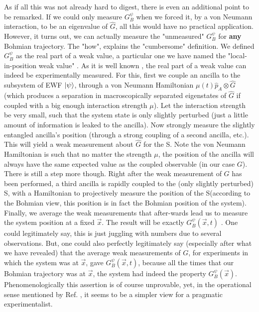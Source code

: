 \documentclass[11pt, a4paper]{article} %
\begin{document}
As if all this was not already hard to digest, there is even an additional point to be remarked. If we could only measure $G_B^\psi$ when we forced it, by a von Neumann interaction, to be an eigenvalue of $\hat{G}$, all this would have no practical application. However, it turns out, we can actually measure the "unmeasured" $G_B^\psi$ for {\bf any} Bohmian trajectory. The "how", explains the "cumbersome" definition. We defined $G^\psi_B$ as the real part of a weak value, a particular one we have named the "local-in-position weak value" \cite{DevInPosition1, DevInPosition2}. As it is well known \cite{Weak}, the real part of a weak value can indeed be experimentally measured. For this, first we couple an ancilla to the subsystem of EWF $\ket{\psi}$, through a von Neumann Hamiltonian $\mu(t)\hat{p}_A\otimes\hat{G}$ (which produces a separation in macroscopically separated eigenstates of $\hat{G}$ if coupled with a big enough interaction strength $\mu$). Let the interaction strength be very small, such that the system state is only slightly perturbed (just a little amount of information is leaked to the ancilla). Now strongly measure the slightly entangled ancilla's position (through a strong coupling of a second ancilla, etc.). This will yield a weak measurement about $\hat{G}$ for the S. Note the von Neumann Hamiltonian is such that no matter the strength $\mu$, the position of the ancilla will always have the same expected value as the coupled observable (in our case $G$). There is still a step more though. Right after the weak measurement of $G$ has been performed, a third ancilla is rapidly coupled to the (only slightly perturbed) S, with a Hamiltonian to projectively measure the position of the S(according to the Bohmian view, this position is in fact the Bohmian position of the system). Finally, we average the weak measurements that after-wards lead us to measure the system position  at a fixed $\vec{x}$. The result will be exactly $G^\psi_B(\vec{x},t)$ \cite{Weak, DevInPosition1}. One could legitimately say, this is just juggling with numbers due to several observations. But, one could also perfectly legitimately say (especially after what we have revealed) that the average weak measurements of $G$, for experiments in which the system was at $\vec{x}$, gave $G^\psi_B(\vec{x},t)$, because all the times that our Bohmian trajectory was at $\vec{x}$, the system had indeed the property $G^\psi_B(\vec{x})$. Phenomenologically this assertion is of course unprovable, yet, in the operational sense mentioned by Ref. \cite{WisemanVel}, it seems to be a simpler view for a pragmatic experimentalist.
\end{document}
